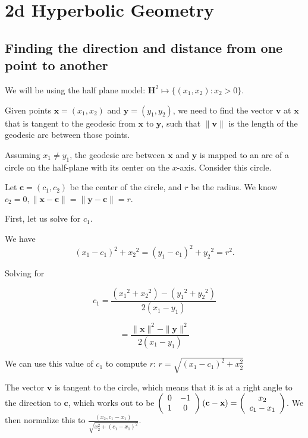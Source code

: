 \section{2d Hyperbolic Geometry}

\subsection{Finding the direction and distance from one point to another}

We will be using the half plane model: $\textbf{H}^2 \mapsto \{(x_1,x_2):x_2 > 0\}$.

Given points $\textbf{x} = (x_1,x_2)$ and $\textbf{y} = (y_1,y_2)$, we need to find the vector $\textbf{v}$ at $\textbf{x}$ that is tangent to the geodesic from $\textbf{x}$ to $\textbf{y}$, such that $\|\textbf{v}\|$ is the length of the geodesic arc between those points.

Assuming $x_1 \neq y_1$, the geodesic arc between $\textbf{x}$ and $\textbf{y}$ is mapped to an arc of a circle on the half-plane with its center on the $x$-axis. Consider this circle.

Let $\textbf{c} = (c_1,c_2)$ be the center of the circle, and $r$ be the radius. We know $c_2 = 0, \|\textbf{x}-\textbf{c}\| = \|\textbf{y}-\textbf{c}\| = r$.

First, let us solve for $c_1$.

We have $$(x_1-c_1)^2+{x_2}^2 = (y_1-c_1)^2+{y_2}^2 = r^2.$$


Solving for 

$$c_1 = \frac{({x_1}^2+{x_2}^2)-({y_1}^2+{y_2}^2)}{2(x_1-y_1)}$$

$$= \frac{\|\textbf{x}\|^2-\|\textbf{y}\|^2}{2(x_1-y_1)}$$

We can use this value of $c_1$ to compute $r$: $r = \sqrt{(x_1 - c_1)^2 + x_2^2}$

The vector $\textbf{v}$ is tangent to the circle, which means that it is at a right angle to the direction to $\textbf{c}$, which works out to be $\left(\begin{array}{ccc} 0 & -1 \\1 & 0 \end{array} \right)(\textbf{c}-\textbf{x}) = \left(\begin{array}{ccc} x_2 \\c_1-x_1 \end{array} \right)$. We then normalize this to $\displaystyle{\frac{(x_2,c_1-x_1)}{\sqrt{x_2^2+(c_1-x_1)^2}}}$.

